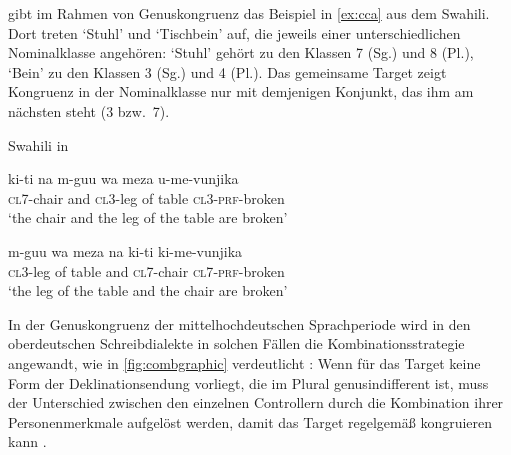 \citet[169]{corbett2006} gibt im Rahmen von Genuskongruenz das Beispiel in
\cref{ex:cca} aus dem Swahili. Dort treten  `Stuhl' und  `Tischbein' auf, die jeweils einer unterschiedlichen
Nominalklasse angehören:  `Stuhl' gehört zu den Klassen 7 (Sg.)
und 8 (Pl.),  `Bein' zu den Klassen 3 (Sg.) und 4 (Pl.). Das
gemeinsame Target  zeigt Kongruenz in der Nominalklasse
nur mit demjenigen Konjunkt, das ihm am nächsten steht (3 bzw.~7).

\begin{exe}
\ex \label{ex:cca}
	\langinfo%
		{Swahili}%
		{}%
		{\cite[45]{bokamba1985} in \cite[169]{corbett2006}}
	\begin{xlist}
	\ex \label{ex:cca_1}
		\gll ki-ti na m-guu wa meza u-me-vunjika \\
			\textsc{cl7}-chair and \textsc{cl3}-leg of table
			\textsc{cl3}-\textsc{prf}-broken \\
		\trans `the chair and the leg of the table are broken'

	\ex \label{ex:cca_2}
		\gll m-guu wa meza na ki-ti ki-me-vunjika \\
			\textsc{cl3}-leg of table and \textsc{cl7}-chair
			\textsc{cl7}-\textsc{prf}-broken \\
		\trans `the leg of the table and the chair are broken'
	\end{xlist}
\end{exe}

In der Genuskongruenz der mittelhochdeutschen Sprachperiode wird in den
oberdeutschen Schreibdialekte in solchen Fällen die Kombinationsstrategie
angewandt, wie in \cref{fig:combgraphic} verdeutlicht
\autocites[vgl.][312]{grimm1890}[329]{grimm1898}[39--41]{behaghel1928}[187--189]{dal2014}:
Wenn für das Target keine Form der Deklinationsendung vorliegt, die im Plural
genusindifferent ist, muss der Unterschied zwischen den einzelnen Controllern
durch die Kombination ihrer Personenmerkmale aufgelöst werden, damit das Target
regelgemäß kongruieren kann
\autocites[vgl.][182--193]{corbett1983}[269--306]{corbett1991}[243--263]{corbett2006}.

